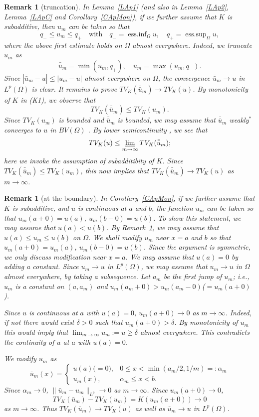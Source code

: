 \documentclass[12pt, reqno]{amsart}
\numberwithin{equation}{section}
\newtheorem{remark}[thm]{Remark}
\DeclareMathOperator*{\essinf}{ess.inf}
\DeclareMathOperator*{\esssup}{ess.sup}
\begin{document}
%
\begin{remark}[truncation] \label{RTru}
In Lemma~\ref{LAp1} (and also in Lemma~\ref{LAp2}, Lemma~\ref{LApC} and Corollary~\ref{CApMon}), if we further assume that $K$ is subadditive, then $u_m$ can be taken so that
\[
	q_- \le u_m \le q_+
	\quad\text{with}\quad q_- = \essinf_\Omega u,\quad 
	q_+ = \esssup_\Omega u,
\]
where the above first estimate holds on $\Omega$ almost everywhere.
 Indeed, we truncate $u_m$ as
\[
	\bar{\bar{u}}_m = \min(\bar{u}_m,q_+),\quad
	\bar{u}_m = \max(u_m, q_-).
\]
Since $|\bar{\bar{u}}_m-u|\le|u_m-u|$ almost everywhere on $\Omega$, the convergence $
\bar{\bar{u}}_m\to u$ in $L^p(\Omega)$ is clear.
 It remains to prove $TV_K(\bar{\bar{u}}_m)\to TV_K(u)$.
 By monotonicity of $K$ in (K1), we observe that
\[
	TV_K(\bar{\bar{u}}_m) \le TV_K(u_m).
\]
Since $TV_K(u_m)$ is bounded and $\bar{\bar{u}}_m$ is bounded, we may assume that $\bar{\bar{u}}_m$ weakly$^*$ converges to $u$ in $BV(\Omega)$ \cite[Proposition 2.3]{GKKOS}.
 By lower semicontinuity \cite[Proposition 2.4]{GKKOS}, we see that
\[
	TV_K(u) \le \varliminf_{m\to\infty} TV_K(\bar{\bar{u}}_m);
\]
here we invoke the assumption of subadditibity of $K$.
Since $TV_K(\bar{\bar{u}}_m)\le TV_K(u_m)$, this now implies that $TV_K(\bar{\bar{u}}_m)\to TV_K(u)$ as $m\to\infty$.
\end{remark}
%
\begin{remark}[at the boundary] \label{RApMon}
In Corollary~\ref{CApMon}, if we further assume that $K$ is subadditive, and $u$ is continuous at $a$ and $b$, the function $u_m$ can be taken so that $u_m(a+0)=u(a)$, $u_m(b-0)=u(b)$.
 To show this statement, we may assume that $u(a)<u(b)$.
 By Remark~\ref{RTru}, we may assume that $u(a)\le u_m\le u(b)$ on $\Omega$.
 We shall modify $u_m$ near $x=a$ and $b$ so that $u_m(a+0)=u_m(a)$, $u_m(b-0)=u(b)$.
 Since the argument is symmetric, we only discuss modification near $x=a$.
 We may assume that $u(a)=0$ by adding a constant.
 Since $u_m\to u$ in $L^p(\Omega)$, we may assume that $u_m\to u$ in $\Omega$ almost everywhere, by taking a subsequence.
 Let $a_m$ be the first jump of $u_m$; i.e., $u_m$ is a constant on $(a,a_m)$ and $u_m(a_m+0)>u_m(a_m-0)$($=u_m(a+0)$).

Since $u$ is continuous at $a$ with $u(a)=0$, $u_m(a+0)\to0$ as $m\to\infty$.
 Indeed, if not there would exist $\delta>0$ such that $u_m(a+0)>\delta$.
 By monotonicity of $u_m$ this would imply that  $\lim_{m\to\infty}u_m:=u\ge\delta$ almost everywhere.
 This contradicts the continuity of $u$ at $a$ with $u(a)=0$.

We modify $u_m$ as
\[
	\bar{u}_m(x) =\left\{
\begin{array}{ll}
	u(a)\text{(}=0\text{)}, & 0 \le x < \min(a_m/2,1/m) =: \alpha_m \\
	u_m(x), & \alpha_m \le x < b.
\end{array}
\right.
\]
Since $\alpha_m\to0$, $\|\bar{u}_m-u_m \|_{L^p}\to0$ as $m\to\infty$.
 Since $u_m(a+0)\to0$,
\[
	TV_K(\bar{u}_m) - TV_K(u_m) = K\left(u_m(a+0)\right)\to0
\]
as $m\to\infty$.
 Thus $TV_K(\bar{u}_m)\to TV_K(u)$ as well as $\bar{u}_m\to u$ in $L^p(\Omega)$.
\end{remark}
\end{document}
